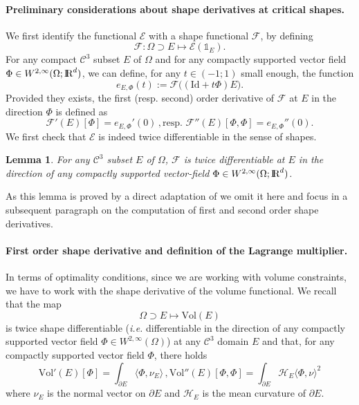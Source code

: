 \documentclass{article}
\newcommand{\R}{\textnormal{I\kern-0.21emR}}
\newtheorem{lemma}[material]{Lemma}
\def\O{{\Omega}}
\numberwithin{equation}{section}
\begin{document}
\paragraph{Preliminary considerations about shape derivatives at critical shapes.} We first identify the functional $\mathscr E$ with a shape functional $\mathscr F$, by defining
\[ \mathscr F: \O\supset E\mapsto \mathscr E(\mathds 1_E).\]
For any compact $\mathscr C^3$ subset $E$ of $\O$ and for any compactly supported vector field $\Phi\in W^{2,\infty}(\O;\R^d)$,  we can define, for any $t\in (-1;1)$ small enough, the function 
\[ e_{E,\Phi}(t):=\mathscr F\Big((\mathrm{Id}+t\Phi)E\Big).\] Provided they exists, the first (resp. second) order derivative of $\mathscr F$ at $E$ in the direction $\Phi$ is defined as 
\[ \mathscr F'(E)[\Phi]=e_{E,\Phi}'(0)\,, \text{resp. }\mathscr F''(E)[\Phi,\Phi]=e_{E,\Phi}''(0).
\]
We first check that $\mathscr E$ is indeed twice differentiable in the sense of shapes.
\begin{lemma}\label{Le:Differentiability}
For any $\mathscr C^3$ subset $E$ of $\O$, $\mathscr F$ is twice differentiable at $E$ in the direction of any compactly supported vector-field $\Phi\in W^{2,\infty}(\O;\R^d)$.
\end{lemma}
As this lemma is proved by a direct adaptation of \cite{MignotMuratPuel} we omit it here and focus in a subsequent paragraph on the computation of first and second order shape derivatives.


\paragraph{First order shape derivative and definition of the Lagrange multiplier.}
In terms of optimality conditions, since we are working with volume constraints, we  have to work with the  shape derivative of the volume functional. We recall \cite[Section 5.9.3, first example]{HenrotPierre} that the map
\[ \O\supset E\mapsto \mathrm{Vol}(E)\] is twice shape differentiable (\emph{i.e.} differentiable in the direction of any compactly supported vector field $\Phi \in W^{2,\infty}(\O)$) at any $\mathscr C^3$ domain $E$ and that, for any compactly supported vector field $\Phi$, there holds 
\begin{equation}\label{Lam} \mathrm{Vol}'(E)[\Phi]=\int_{\partial E}\langle \Phi,\nu_E\rangle\,, \mathrm{Vol}''(E)[\Phi,\Phi]=\int_{\partial E}\mathscr H_E \langle \Phi,\nu\rangle^2\end{equation} where $\nu_E$ is the normal vector on $\partial E$ and $\mathscr H_E$ is the mean curvature of $\partial E$.
\end{document}
